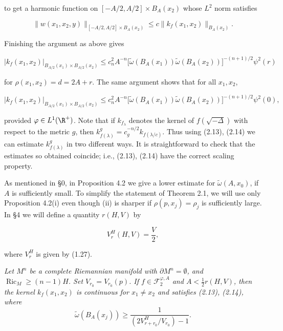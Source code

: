 to get a harmonic function on $[-A/2,A/2]\times B_A(x_2)$ whose $L^2$ norm satisfies

\begin{equation}\tag{2.12}
\|w(x_1,x_2,y)\|_{[-A/2,A/2]\times B_A(x_2)}
\le c\|k_f(x_1,x_2)\|_{B_A(x_2)}.
\end{equation}

Finishing the argument as above gives

\begin{equation}\tag{2.13}
\left|k_f(x_1,x_2)\right|_{B_{A/2}(x_1)\times B_{A/2}(x_2)}
\le c_n^2A^{-n}\bigl[\tilde{\omega}(B_A(x_1))\tilde{\omega}(B_A(x_2))\bigr]^{-(n+1)/2}\psi^2(r)
\end{equation}

for $\rho(x_1,x_2)=d=2A+r$. The same argument shows that for all $x_1,x_2$,

\begin{equation}\tag{2.14}
\left|k_f(x_1,x_2)\right|_{B_{A/2}(x_1)\times B_{A/2}(x_2)}
\le c_n^2A^{-n}\bigl[\tilde{\omega}(B_A(x_1))\tilde{\omega}(B_A(x_2))\bigr]^{-(n+1)/2}\psi^2(0),
\end{equation}

provided $\varphi\in L^1(\R^+)$. Note that if $k_{f_\lambda}$ denotes the kernel of
$f(\sqrt{-\Delta})$ with respect to the metric $g$, then
$k^g_{f(\lambda)}=c^{-n/2}_g k_{f(\lambda/c)}$. Thus using (2.13), (2.14) we
can estimate $k^g_{f(\lambda)}$ in two different ways. It is straightforward to
check that the estimates so obtained coincide; i.e., (2.13), (2.14) have the
correct scaling property.

As mentioned in \S0, in Proposition 4.2 we give a lower estimate for
$\tilde{\omega}(A,x_0)$, if $A$ is sufficiently small. To simplify the statement
of Theorem 2.1, we will use only Proposition 4.2(i) even though (ii) is sharper
if $\rho(p,x_j)=\rho_j$ is sufficiently large. In \S4 we will define a quantity
$r(H,V)$ by

\begin{equation}\tag{2.15}
V_r^H(H,V)=\frac{V}{2},
\end{equation}

where $V_r^H$ is given by (1.27).

\begin{theorem}
\label{thm:kernel-estimates-ricci-lower-bound}

\textit{Let $M^n$ be a complete Riemannian manifold with $\partial M^n=\emptyset$, and $\operatorname{Ric}_M \ge (n-1)H$. Set $V_{r_0}=V_{r_0}(p)$. If $f \in \mathcal{F}^{\varphi,A}_2$ and $A < \frac12 r(H,V)$, then the kernel $k_f(x_1,x_2)$ is continuous for $x_1 \neq x_2$ and satisfies (2.13), (2.14), where}
\begin{equation}\tag{2.16}
\widetilde{\omega}(B_A(x_j)) \ge \frac{1}{\left(2V_{r+r_0}^{H}/V_{r_0}\right)-1}.
\end{equation}
\end{theorem}

